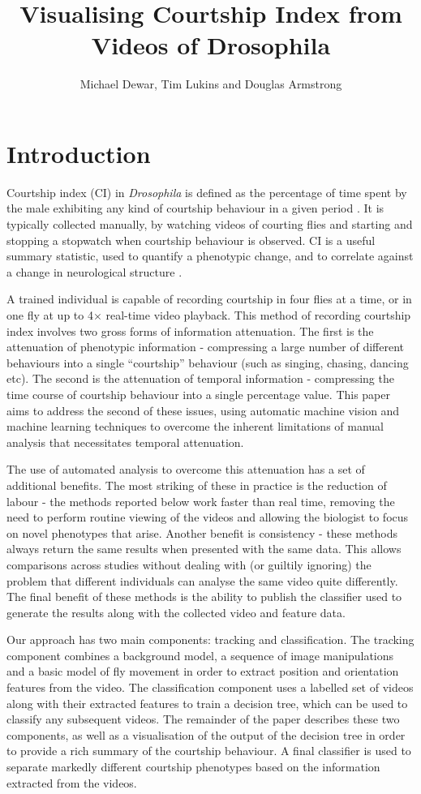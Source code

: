 \documentclass[acmtocl]{acmtrans2m}
\title{Visualising Courtship Index from Videos of Drosophila}
\author{Michael Dewar, Tim Lukins and Douglas Armstrong}
\begin{document}
	
	\maketitle

\section{Introduction}

Courtship index (CI) in \emph{Drosophila} is defined as the percentage of time spent by the male exhibiting any kind of courtship behaviour in a given period \cite{}. It is typically collected manually, by watching videos of courting flies and starting and stopping a stopwatch when courtship behaviour is observed. CI is a useful summary statistic, used to quantify a phenotypic change, and to correlate against a change in neurological structure \cite{}.

A trained individual is capable of recording courtship in four flies at a time, or in one fly at up to 4$\times$ real-time video playback. This method of recording courtship index involves two gross forms of information attenuation. The first is the attenuation of phenotypic information - compressing a large number of different behaviours into a single ``courtship'' behaviour (such as singing, chasing, dancing etc). The second is the attenuation of temporal information - compressing the time course of courtship behaviour into a single percentage value. This paper aims to address the second of these issues, using automatic machine vision and machine learning techniques to overcome the inherent limitations of manual analysis that necessitates temporal attenuation.

The use of automated analysis to overcome this attenuation has a set of additional benefits. The most striking of these in practice is the reduction of labour - the methods reported below work faster than real time, removing the need to perform routine viewing of the videos and allowing the biologist to focus on novel phenotypes that arise. Another benefit is consistency - these methods always return the same results when presented with the same data. This allows comparisons across studies without dealing with (or guiltily ignoring) the problem that different individuals can analyse the same video quite differently. The final benefit of these methods is the ability to publish the classifier used to generate the results along with the collected video and feature data.

Our approach has two main components: tracking and classification. The tracking component combines a background model, a sequence of image manipulations and a basic model of fly movement in order to extract position and orientation features from the video. The classification component uses a labelled set of videos along with their extracted features to train a decision tree, which can be used to classify any subsequent videos. The remainder of the paper describes these two components, as well as a visualisation of the output of the decision tree in order to provide a rich summary of the courtship behaviour. A final classifier is used to separate markedly different courtship phenotypes based on the information extracted from the videos.
\end{document}
